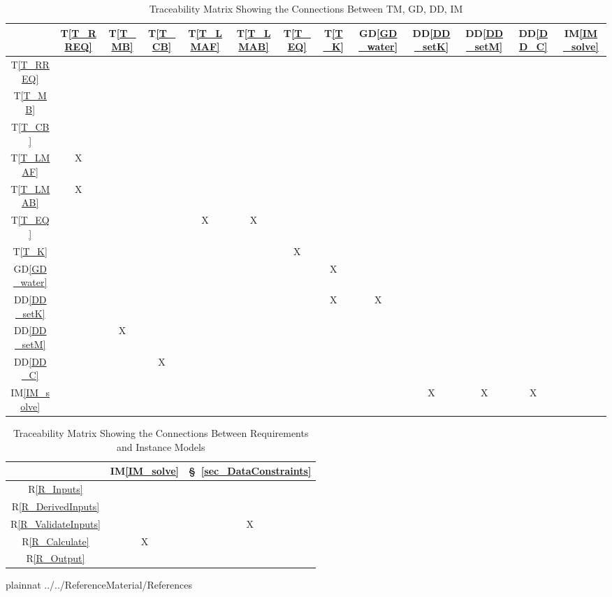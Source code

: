 \documentclass[12pt]{article}
\newcommand{\dref}[1]{GD\ref{#1}}
\newcommand{\ddref}[1]{DD\ref{#1}}
\newcommand{\tref}[1]{T\ref{#1}}
\newcommand{\iref}[1]{IM\ref{#1}}
\newcommand{\rref}[1]{R\ref{#1}}
\newcommand{\sref}[1]{\S~\ref{#1}}
\begin{document}
\begin{table}[h!]
\centering
\begin{tabular}{|c|c|c|c|c|c|c|c|c|c|c|c|c|}
\hline        
	& \tref{T_RREQ}& \tref{T_MB}& \tref{T_CB}& \tref{T_LMAF}& \tref{T_LMAB} & 
      \tref{T_EQ}& \tref{T_K} & \dref{GD_water}& \ddref{DD_setK}& 
      \ddref{DD_setM}& \ddref{DD_C}& \iref{IM_solve} \\
\hline
\tref{T_RREQ}    & & & & & & & & & & & & \\ \hline
\tref{T_MB}      & & & & & & & & & & & & \\ \hline
\tref{T_CB}      & & & & & & & & & & & & \\ \hline
\tref{T_LMAF}    &X& & & & & & & & & & & \\ \hline
\tref{T_LMAB}    &X& & & & & & & & & & & \\ \hline
\tref{T_EQ}      & & & &X&X& & & & & & & \\ \hline
\tref{T_K}       & & & & & &X& & & & & & \\ \hline
\dref{GD_water}  & & & & & & &X& & & & & \\ \hline
\ddref{DD_setK}  & & & & & & &X&X& & & & \\ \hline
\ddref{DD_setM}  & &X& & & & & & & & & & \\ \hline
\ddref{DD_C}     & & &X& & & & & & & & & \\ \hline
\iref{IM_solve}  & & & & & & & & &X&X&X& \\
\hline
\end{tabular}
\caption{Traceability Matrix Showing the Connections Between TM, GD, DD, IM}
\label{Table:trace}
\end{table}

\begin{table}[h!]
\centering
\begin{tabular}{|c|c|c|}
\hline
	& \iref{IM_solve}& \sref{sec_DataConstraints} \\
\hline
\rref{R_Inputs}     & &\\ \hline
\rref{R_DerivedInputs}    & &\\ \hline
\rref{R_ValidateInputs}  & &X\\ \hline
\rref{R_Calculate}     &X &\\ \hline 
\rref{R_Output}       & & \\ 
\hline
\end{tabular}
\caption{Traceability Matrix Showing the Connections Between Requirements and 
  Instance Models}
\label{Table:R_trace}
\end{table}

\newpage
\newpage

 {plainnat}
 {../../ReferenceMaterial/References}

~\newline

\end{document}
